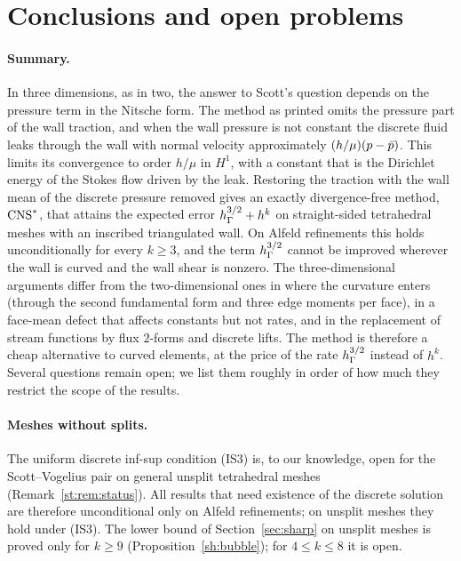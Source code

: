 \section{Conclusions and open problems}\label{sec:open}

\paragraph{Summary.} In three dimensions, as in two, the answer to Scott's question depends on the pressure term in the Nitsche form. The method as printed omits the pressure part of the wall traction, and when the wall pressure is not constant the discrete fluid leaks through the wall with normal velocity approximately $(h/\mu)(p-\bar p)$. This limits its convergence to order $h/\mu$ in $H^1$, with a constant that is the Dirichlet energy of the Stokes flow driven by the leak. Restoring the traction with the wall mean of the discrete pressure removed gives an exactly divergence-free method, $\mathrm{CNS}^\ast$, that attains the expected error $h_\Gamma^{3/2}+h^k$ on straight-sided tetrahedral meshes with an inscribed triangulated wall. On Alfeld refinements this holds unconditionally for every $k\ge3$, and the term $h_\Gamma^{3/2}$ cannot be improved wherever the wall is curved and the wall shear is nonzero. The three-dimensional arguments differ from the two-dimensional ones in where the curvature enters (through the second fundamental form and three edge moments per face), in a face-mean defect that affects constants but not rates, and in the replacement of stream functions by flux $2$-forms and discrete lifts. The method is therefore a cheap alternative to curved elements, at the price of the rate $h_\Gamma^{3/2}$ instead of $h^k$. Several questions remain open; we list them roughly in order of how much they restrict the scope of the results.

\paragraph{Meshes without splits.} The uniform discrete inf-sup condition (IS3) is, to our knowledge, open for the Scott--Vogelius pair on general unsplit tetrahedral meshes (Remark~\ref{st:rem:status}). All results that need existence of the discrete solution are therefore unconditional only on Alfeld refinements; on unsplit meshes they hold under (IS3). The lower bound of Section~\ref{sec:sharp} on unsplit meshes is proved only for $k\ge9$ (Proposition~\ref{sh:bubble}); for $4\le k\le8$ it is open.

